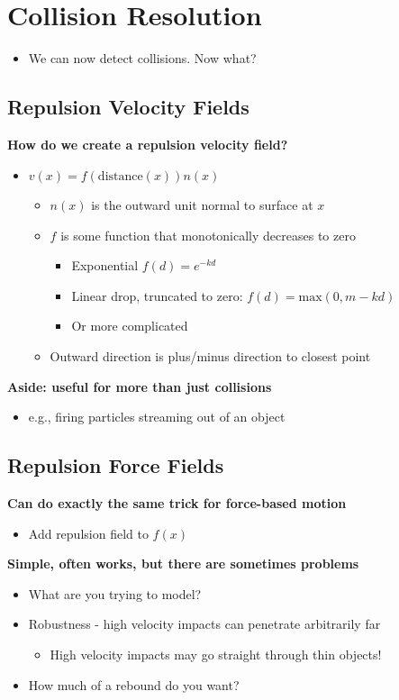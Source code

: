 \documentclass{article}
\begin{document}
\section*{Collision Resolution}
\begin{itemize}
    \item We can now detect collisions.  Now what?
\end{itemize}
\subsection*{Repulsion Velocity Fields}
\textbf{How do we create a repulsion velocity field?}
\begin{itemize}
    \item $v(x) = f(\text{distance}(x))n(x)$
    \begin{itemize}
        \item $n(x)$ is the outward unit normal to surface at $x$
        \item $f$ is some function that monotonically decreases to zero
        \begin{itemize}
            \item Exponential $f(d) = e^{-kd}$
            \item Linear drop, truncated to zero: $f(d) = \text{max}(0, m - kd)$
            \item Or more complicated
        \end{itemize}
        \item Outward direction is plus/minus direction to closest point
    \end{itemize}
\end{itemize}
\textbf{Aside: useful for more than just collisions}
\begin{itemize}
    \item e.g., firing particles streaming out of an object
\end{itemize}

\subsection*{Repulsion Force Fields}
\textbf{Can do exactly the same trick for force-based motion}
\begin{itemize}
    \item Add repulsion field to $f(x)$
\end{itemize}
\textbf{Simple, often works, but there are sometimes problems}
\begin{itemize}
    \item What are you trying to model?
    \item Robustness - high velocity impacts can penetrate arbitrarily far
    \begin{itemize}
        \item High velocity impacts may go straight through thin objects!
    \end{itemize}
    \item How much of a rebound do you want?
\end{itemize}
\end{document}

